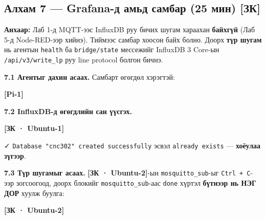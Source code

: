 \hypertarget{ux430ux43bux445ux430ux43c-7-grafana-ux434-ux430ux43cux44cux434-ux441ux430ux43cux431ux430ux440-25-ux43cux438ux43d-ux437ux43a}{%
\subsection{Алхам 7 --- Grafana-д амьд самбар (25 мин) {[}ЗК{]}}\label{ux430ux43bux445ux430ux43c-7-grafana-ux434-ux430ux43cux44cux434-ux441ux430ux43cux431ux430ux440-25-ux43cux438ux43d-ux437ux43a}}

\textbf{Анхаар:} Лаб 1-д MQTT-ээс InfluxDB руу бичих шугам хараахан \textbf{байхгүй} (Лаб 5-д Node-RED-ээр хийнэ). Тиймээс самбар хоосон байх болно. Доорх \textbf{түр шугам} нь агентын \texttt{health} ба \texttt{bridge/state} мессежийг InfluxDB 3 Core-ын \texttt{/\allowbreak{}api/\allowbreak{}v3/\allowbreak{}write\_\allowbreak{}lp} руу line protocol болгон бичнэ.

\textbf{7.1 Агентыг дахин асаах.} Самбарт өгөгдөл хэрэгтэй:

\textbf{{[}Pi-1{]}}

\begin{Shaded}
\begin{Highlighting}[]
\KeywordTok{\&\&} 
\end{Highlighting}
\end{Shaded}

\textbf{7.2 InfluxDB-д өгөгдлийн сан үүсгэх.}

\textbf{{[}ЗК · Ubuntu-1{]}}

\begin{Shaded}
\begin{Highlighting}[]
\end{Highlighting}
\end{Shaded}

✓ \texttt{Database\ "cnc302"\ created\ successfully} эсвэл \texttt{already\ exists} --- \textbf{хоёулаа зүгээр}.

\textbf{7.3 Түр шугамыг асаах.} \textbf{{[}ЗК · Ubuntu-2{]}}-ын \texttt{mosquitto\_sub}-ыг \texttt{Ctrl\ +\ C}-ээр зогсоогоод, доорх блокийг \texttt{mosquitto\_sub}-аас \texttt{done} хүртэл \textbf{бүтнээр нь НЭГ ДОР} хуулж буулга:

\textbf{{[}ЗК · Ubuntu-2{]}}

